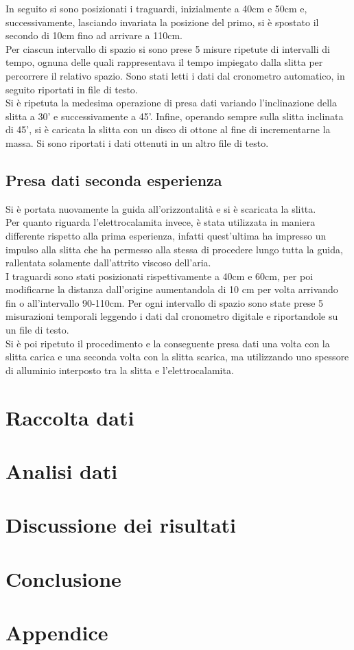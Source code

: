 \documentclass[a4paper,11pt,oneside]{article}
\begin{document}
In seguito si sono posizionati i traguardi, inizialmente a 40cm e 50cm e, successivamente, lasciando invariata la posizione del primo, si è spostato il secondo di 10cm fino ad arrivare a 110cm. \\
Per ciascun intervallo di spazio si sono prese 5 misure ripetute di intervalli di tempo, ognuna delle quali rappresentava il tempo impiegato dalla slitta per percorrere il relativo spazio. Sono stati letti i dati dal cronometro automatico, in seguito riportati in file di testo.\\
Si è ripetuta la medesima operazione di presa dati variando l'inclinazione della slitta a 30' e successivamente a 45'.
Infine, operando sempre sulla slitta inclinata di 45', si è caricata la slitta con un disco di ottone al fine di incrementarne la massa. Si sono riportati i dati ottenuti in un altro file di testo.

\subsection{Presa dati seconda esperienza}
Si è portata nuovamente la guida all'orizzontalità e si è scaricata la slitta. \\
Per quanto riguarda l'elettrocalamita invece, è stata utilizzata in maniera differente rispetto alla prima esperienza, infatti quest'ultima ha impresso un impulso alla slitta che ha permesso alla stessa di procedere lungo tutta la guida, rallentata solamente dall'attrito viscoso dell'aria.\\
I traguardi sono stati posizionati rispettivamente a 40cm e 60cm, per poi modificarne la distanza dall'origine aumentandola di 10 cm per volta arrivando fin o all'intervallo 90-110cm.
Per ogni intervallo di spazio sono state prese 5 misurazioni temporali leggendo i dati dal cronometro digitale e riportandole su un file di testo.\\
Si è poi ripetuto il procedimento e la conseguente presa dati una volta con la slitta carica e una seconda volta con la slitta scarica, ma utilizzando uno spessore di alluminio interposto tra la slitta e l'elettrocalamita.



\section{Raccolta dati}
\section{Analisi dati}
\section{Discussione dei risultati}
\section{Conclusione}
\section{Appendice}
\newpage
\end{document}
